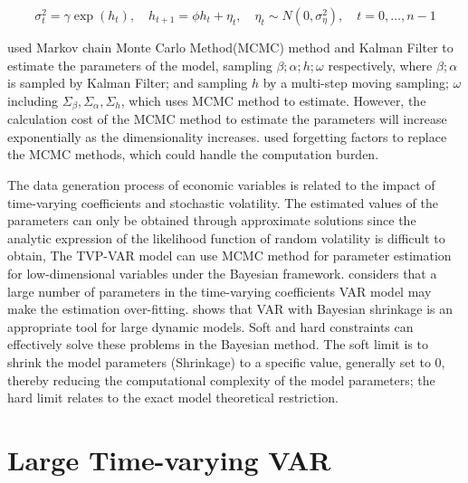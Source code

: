 \documentclass[11pt]{article}
\begin{document}
\begin{equation}
	\sigma_{t}^{2}=\gamma \exp \left(h_{t}\right), \quad h_{t+1}=\phi h_{t}+\eta_{t}, \quad \eta_{t} \sim 
		N\left(0, \sigma_{\eta}^{2}\right), \quad t=0, \ldots, n-1
	\label{nakajima_sv}
\end{equation}


\cite{nakajima2011time} used Markov chain Monte Carlo Method(MCMC) method and Kalman Filter to estimate the parameters of the model, 
sampling $\beta; \alpha; h; \omega$ respectively, where $\beta; \alpha$ is sampled by Kalman Filter; 
and sampling $h$ by a multi-step moving sampling; $\omega$ including $\Sigma_{\beta},\Sigma_{\alpha},\Sigma_{h}$, 
which \cite{nakajima2011time} uses MCMC method to estimate. 
However, the calculation cost of the MCMC method to estimate the parameters will increase exponentially  as the dimensionality increases.
\cite{koop2013large} used forgetting factors to replace the MCMC methods, which could handle the computation burden.


The data generation process of economic variables is related to the impact of time-varying coefficients and stochastic volatility. 
 The estimated values of the parameters can only be obtained through approximate solutions
 since the analytic expression of the likelihood function of random volatility is difficult to obtain,
The TVP-VAR model can use MCMC method for parameter estimation for low-dimensional variables under the Bayesian framework. 
\cite{koop2010bayesian} considers that a large number of parameters in the time-varying coefficients VAR model may make the estimation over-fitting. 
\cite{banbura2010large} shows that VAR with Bayesian shrinkage is an appropriate tool for large dynamic models. 
Soft and hard constraints can effectively solve these problems in the Bayesian method. 
The soft limit is to shrink the model parameters (Shrinkage) to a specific value, generally set to 0, 
thereby reducing the computational complexity of the model parameters; the hard limit relates to the exact model theoretical restriction.





\section{Large Time-varying VAR}
\end{document}
